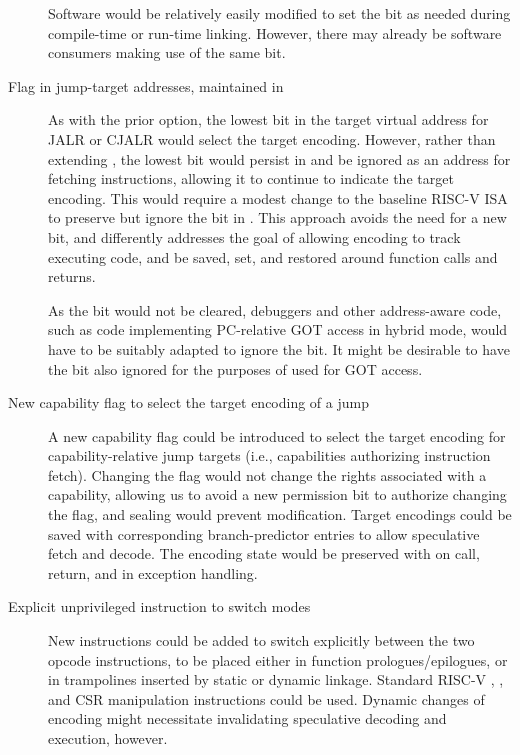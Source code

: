 \begin{description}
  Software would be relatively easily modified to set the bit as needed
  during compile-time or run-time linking.
  However, there may already be software consumers making use of the same
  bit.

\item[Flag in jump-target addresses, maintained in \PCC{}]
  As with the prior option, the lowest bit in the target virtual address for
  JALR or CJALR would select the target encoding.
  However, rather than extending \xccsr{}, the lowest bit would persist in
  \PCC{} and be ignored as an address for fetching instructions, allowing it
  to continue to indicate the target encoding.
  This would require a modest change to the baseline RISC-V ISA to preserve
  but ignore the bit in \PC{}.
  This approach avoids the need for a new \xccsr{} bit, and differently
  addresses the goal of allowing encoding to track executing code, and be
  saved, set, and restored around function calls and returns.

  As the bit would not be cleared, debuggers and other address-aware code,
  such as code implementing PC-relative GOT access in hybrid mode, would have
  to be suitably adapted to ignore the bit.
  It might be desirable to have the bit also ignored for the purposes of
   used for GOT access.

\item[New capability flag to select the target encoding of a jump]
  A new capability flag could be introduced to select the target encoding for
  capability-relative jump targets (i.e., capabilities authorizing instruction
  fetch).
  Changing the flag would not change the rights associated with a capability,
  allowing us to avoid a new permission bit to authorize changing the flag,
  and sealing would prevent modification.
  Target encodings could be saved with corresponding branch-predictor entries
  to allow speculative fetch and decode.
  The encoding state would be preserved with \PCC{} on call, return, and in
  exception handling.

\item[Explicit unprivileged instruction to switch modes]
  New instructions could be added to switch explicitly between the two opcode
  instructions, to be placed either in function prologues/epilogues, or in
  trampolines inserted by static or dynamic linkage.
  Standard RISC-V , , and 
  CSR manipulation instructions could be used.
  Dynamic changes of encoding might necessitate invalidating speculative
  decoding and execution, however.


\end{description}
